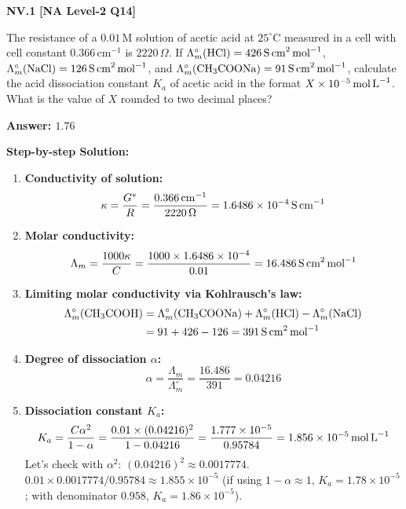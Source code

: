 \begin{problembox}
\textbf{NV.1} \hfill \textbf{[NA Level-2 Q14]}

The resistance of a $0.01\,\text{M}$ solution of acetic acid at $25^\circ\text{C}$ measured in a cell with cell constant $0.366\,\text{cm}^{-1}$ is $2220\,\Omega$. If $\Lambda_m^\circ(\ce{HCl}) = 426\,\text{S\,cm}^2\,\text{mol}^{-1}$, $\Lambda_m^\circ(\ce{NaCl}) = 126\,\text{S\,cm}^2\,\text{mol}^{-1}$, and $\Lambda_m^\circ(\ce{CH3COONa}) = 91\,\text{S\,cm}^2\,\text{mol}^{-1}$, calculate the acid dissociation constant $K_a$ of acetic acid in the format $X \times 10^{-5}\,\text{mol\,L}^{-1}$. What is the value of $X$ rounded to two decimal places?
\end{problembox}
\begin{solution}
\textbf{Answer: $1.76$}

\textbf{Step-by-step Solution:}
\begin{enumerate}
    \item \textbf{Conductivity of solution:}
    \begin{equation*}
        \kappa = \frac{G^*}{R} = \frac{0.366\,\text{cm}^{-1}}{2220\,\Omega} = 1.6486 \times 10^{-4}\,\text{S\,cm}^{-1}
    \end{equation*}
    \item \textbf{Molar conductivity:}
    \begin{equation*}
        \Lambda_m = \frac{1000 \kappa}{C} = \frac{1000 \times 1.6486 \times 10^{-4}}{0.01} = 16.486\,\text{S\,cm}^2\,\text{mol}^{-1}
    \end{equation*}
    \item \textbf{Limiting molar conductivity via Kohlrausch's law:}
    \begin{align*}
        \Lambda_m^\circ(\ce{CH3COOH}) &= \Lambda_m^\circ(\ce{CH3COONa}) + \Lambda_m^\circ(\ce{HCl}) - \Lambda_m^\circ(\ce{NaCl}) \\
        &= 91 + 426 - 126 = 391\,\text{S\,cm}^2\,\text{mol}^{-1}
    \end{align*}
    \item \textbf{Degree of dissociation $\alpha$:}
    \begin{equation*}
        \alpha = \frac{\Lambda_m}{\Lambda_m^\circ} = \frac{16.486}{391} = 0.04216
    \end{equation*}
    \item \textbf{Dissociation constant $K_a$:}
    \begin{equation*}
        K_a = \frac{C \alpha^2}{1 - \alpha} = \frac{0.01 \times (0.04216)^2}{1 - 0.04216} = \frac{1.777 \times 10^{-5}}{0.95784} = 1.856 \times 10^{-5}\,\text{mol\,L}^{-1}
    \end{equation*}
    Let's check with $\alpha^2$: $(0.04216)^2 \approx 0.0017774$. $0.01 \times 0.0017774 / 0.95784 \approx 1.855 \times 10^{-5}$ (if using $1-\alpha \approx 1$, $K_a = 1.78 \times 10^{-5}$; with denominator $0.958$, $K_a = 1.86 \times 10^{-5}$).
\end{enumerate}
\end{solution}

